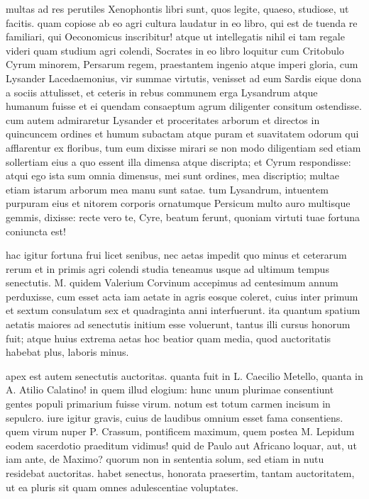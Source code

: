  multas ad res perutiles Xenophontis libri sunt, quos legite, quaeso, studiose, ut facitis. quam copiose ab eo agri cultura laudatur in eo libro, qui est de tuenda re familiari, qui Oeconomicus inscribitur! atque ut intellegatis nihil ei tam regale videri quam studium agri colendi, Socrates in eo libro loquitur cum Critobulo Cyrum minorem, Persarum regem, praestantem ingenio atque imperi gloria, cum Lysander Lacedaemonius, vir summae virtutis, venisset ad eum Sardis eique dona a sociis attulisset, et ceteris in rebus communem erga Lysandrum atque humanum fuisse et ei quendam consaeptum agrum diligenter consitum ostendisse. cum autem admiraretur Lysander et proceritates arborum et directos in quincuncem ordines et humum subactam atque puram et suavitatem odorum qui afflarentur ex floribus, tum eum dixisse mirari se non modo diligentiam sed etiam sollertiam eius a quo essent illa dimensa atque discripta; et Cyrum respondisse: atqui ego ista sum omnia dimensus, mei sunt ordines, mea discriptio; multae etiam istarum arborum mea manu sunt satae. tum Lysandrum, intuentem purpuram eius et nitorem corporis ornatumque Persicum multo auro multisque gemmis, dixisse: recte vero te, Cyre, beatum ferunt, quoniam virtuti tuae fortuna coniuncta est!

 hac igitur fortuna frui licet senibus, nec aetas impedit quo minus et ceterarum rerum et in primis agri colendi studia teneamus usque ad ultimum tempus senectutis. M. quidem Valerium Corvinum accepimus ad centesimum annum perduxisse, cum esset acta iam aetate in agris eosque coleret, cuius inter primum et sextum consulatum sex et quadraginta anni interfuerunt. ita quantum spatium aetatis maiores ad senectutis initium esse voluerunt, tantus illi cursus honorum fuit; atque huius extrema aetas hoc beatior quam media, quod auctoritatis habebat plus, laboris minus.

 apex est autem senectutis auctoritas. quanta fuit in L. Caecilio Metello, quanta in A. Atilio Calatino! in quem illud elogium: hunc unum plurimae consentiunt gentes populi primarium fuisse virum. notum est totum carmen incisum in sepulcro. iure igitur gravis, cuius de laudibus omnium esset fama consentiens. quem virum nuper P. Crassum, pontificem maximum, quem postea M. Lepidum eodem sacerdotio praeditum vidimus! quid de Paulo aut Africano loquar, aut, ut iam ante, de Maximo? quorum non in sententia solum, sed etiam in nutu residebat auctoritas. habet senectus, honorata praesertim, tantam auctoritatem, ut ea pluris sit quam omnes adulescentiae voluptates.

